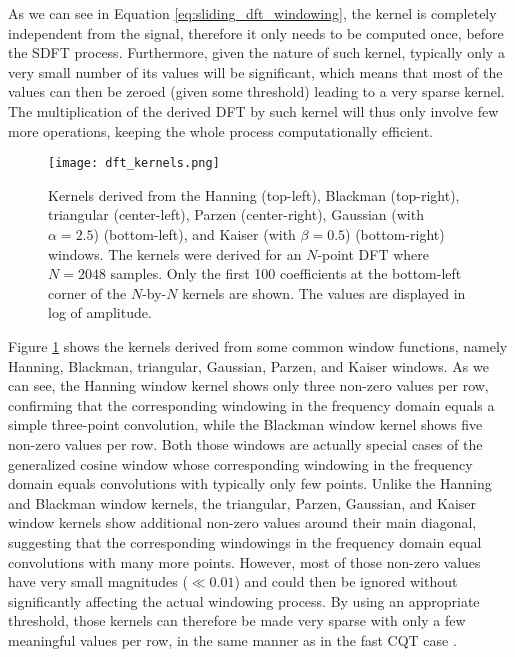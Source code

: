 \documentclass[journal]{IEEEtran}
\begin{document}
As we can see in Equation \ref{eq:sliding_dft_windowing}, the kernel is completely independent from the signal, therefore it only needs to be computed once, before the SDFT process. Furthermore, given the nature of such kernel, typically only a very small number of its values will be significant, which means that most of the values can then be zeroed (given some threshold) leading to a very sparse kernel. The multiplication of the derived DFT by such kernel will thus only involve few more operations, keeping the whole process computationally efficient.

\begin{figure}[htbp]
	\centering
	\texttt{[image: dft\_kernels.png]}
	\caption{Kernels derived from the Hanning (top-left), Blackman (top-right), triangular (center-left), Parzen (center-right), Gaussian (with $\alpha = 2.5$) (bottom-left), and Kaiser (with $\beta = 0.5$) (bottom-right) windows. The kernels were derived for an $N$-point DFT where $N = 2048$ samples. Only the first 100 coefficients at the bottom-left corner of the $N$-by-$N$ kernels are shown. The values are displayed in log of amplitude.}
	\label{fig:dft_kernels}
\end{figure}

Figure \ref{fig:dft_kernels} shows the kernels derived from some common window functions, namely Hanning, Blackman, triangular, Gaussian, Parzen, and Kaiser windows. As we can see, the Hanning window kernel shows only three non-zero values per row, confirming that the corresponding windowing in the frequency domain equals a simple three-point convolution, while the Blackman window kernel shows five non-zero values per row. Both those windows are actually special cases of the generalized cosine window whose corresponding windowing in the frequency domain equals convolutions with typically only few points. Unlike the Hanning and Blackman window kernels, the triangular, Parzen, Gaussian, and Kaiser window kernels show additional non-zero values around their main diagonal, suggesting that the corresponding windowings in the frequency domain equal convolutions with many more points. However, most of those non-zero values have very small magnitudes ($\ll 0.01$) and could then be ignored without significantly affecting the actual windowing process. By using an appropriate threshold, those kernels can therefore be made very sparse with only a few meaningful values per row, in the same manner as in the fast CQT case \cite{brown1992}.
\end{document}
